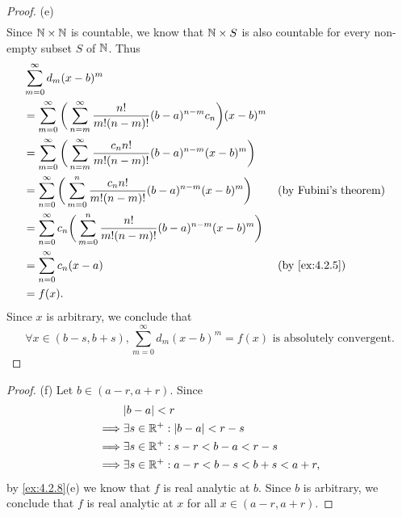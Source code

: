 \begin{proof}{(e)}
\begin{align*}
  \end{align*}
  Since \(\mathbb{N} \times \mathbb{N}\) is countable, we know that \(\mathbb{N} \times S\) is also countable for every non-empty subset \(S\) of \(\mathbb{N}\).
  Thus
  \begin{align*}
     & \sum_{m = 0}^\infty d_m (x - b)^m                                                                                                             \\
     & = \sum_{m = 0}^\infty \bigg(\sum_{n = m}^\infty \dfrac{n!}{m! (n - m)!} (b - a)^{n - m} c_n\bigg) (x - b)^m                                   \\
     & = \sum_{m = 0}^\infty \bigg(\sum_{n = m}^\infty \dfrac{c_n n!}{m! (n - m)!} (b - a)^{n - m} (x - b)^m\bigg)                                   \\
     & = \sum_{n = 0}^\infty \bigg(\sum_{m = 0}^n \dfrac{c_n n!}{m! (n - m)!} (b - a)^{n - m} (x - b)^m\bigg)      &  & \text{(by Fubini's theorem)} \\
     & = \sum_{n = 0}^\infty c_n \bigg(\sum_{m = 0}^n \dfrac{n!}{m! (n - m)!} (b - a)^{n - m} (x - b)^m\bigg)                                        \\
     & = \sum_{n = 0}^\infty c_n (x - a)                                                                           &  & \by{ex:4.2.5}                \\
     & = f(x).
  \end{align*}
  Since \(x\) is arbitrary, we conclude that
  \[
    \forall x \in (b - s, b + s), \sum_{m = 0}^\infty d_m (x - b)^m = f(x) \text{ is absolutely convergent}.
  \]
\end{proof}

\begin{proof}{(f)}
  Let \(b \in (a - r, a + r)\).
  Since
  \begin{align*}
             & \abs{b - a} < r                                     \\
    \implies & \exists s \in \R^+ : \abs{b - a} < r - s            \\
    \implies & \exists s \in \R^+ : s - r < b - a < r - s          \\
    \implies & \exists s \in \R^+ : a - r < b - s < b + s < a + r,
  \end{align*}
  by \cref{ex:4.2.8}(e) we know that \(f\) is real analytic at \(b\).
  Since \(b\) is arbitrary, we conclude that \(f\) is real analytic at \(x\) for all \(x \in (a - r, a + r)\).
\end{proof}